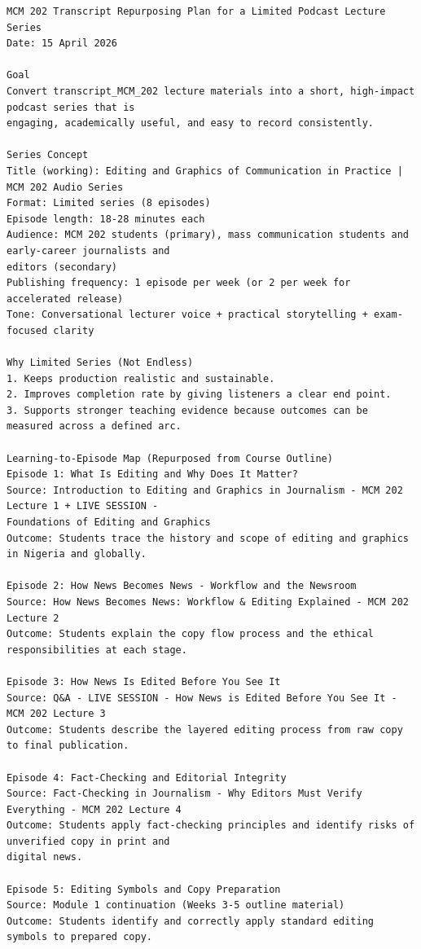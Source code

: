 {\small
\begin{Verbatim}
MCM 202 Transcript Repurposing Plan for a Limited Podcast Lecture Series
Date: 15 April 2026

Goal
Convert transcript_MCM_202 lecture materials into a short, high-impact podcast series that is
engaging, academically useful, and easy to record consistently.

Series Concept
Title (working): Editing and Graphics of Communication in Practice | MCM 202 Audio Series
Format: Limited series (8 episodes)
Episode length: 18-28 minutes each
Audience: MCM 202 students (primary), mass communication students and early-career journalists and
editors (secondary)
Publishing frequency: 1 episode per week (or 2 per week for accelerated release)
Tone: Conversational lecturer voice + practical storytelling + exam-focused clarity

Why Limited Series (Not Endless)
1. Keeps production realistic and sustainable.
2. Improves completion rate by giving listeners a clear end point.
3. Supports stronger teaching evidence because outcomes can be measured across a defined arc.

Learning-to-Episode Map (Repurposed from Course Outline)
Episode 1: What Is Editing and Why Does It Matter?
Source: Introduction to Editing and Graphics in Journalism - MCM 202 Lecture 1 + LIVE SESSION -
Foundations of Editing and Graphics
Outcome: Students trace the history and scope of editing and graphics in Nigeria and globally.

Episode 2: How News Becomes News - Workflow and the Newsroom
Source: How News Becomes News: Workflow & Editing Explained - MCM 202 Lecture 2
Outcome: Students explain the copy flow process and the ethical responsibilities at each stage.

Episode 3: How News Is Edited Before You See It
Source: Q&A - LIVE SESSION - How News is Edited Before You See It - MCM 202 Lecture 3
Outcome: Students describe the layered editing process from raw copy to final publication.

Episode 4: Fact-Checking and Editorial Integrity
Source: Fact-Checking in Journalism - Why Editors Must Verify Everything - MCM 202 Lecture 4
Outcome: Students apply fact-checking principles and identify risks of unverified copy in print and
digital news.

Episode 5: Editing Symbols and Copy Preparation
Source: Module 1 continuation (Weeks 3-5 outline material)
Outcome: Students identify and correctly apply standard editing symbols to prepared copy.


\end{Verbatim}}
